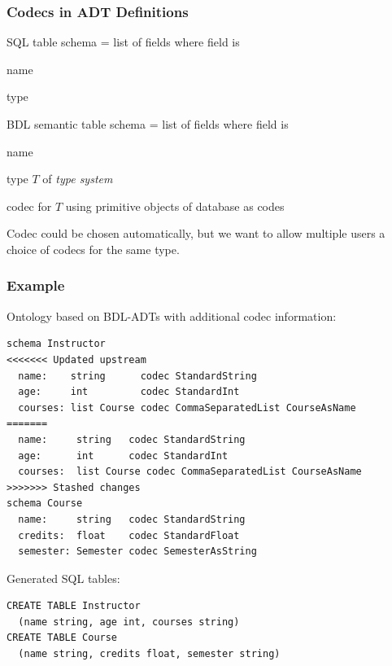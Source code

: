 \begin{frame}\frametitle{Codecs in ADT Definitions}
\begin{blockitems}{SQL table schema = list of fields where field is}
\item name
\item type 
\end{blockitems}

\begin{blockitems}{BDL semantic table schema = list of fields where field is}
\item name
\item type $T$ of \emph{type system} 
\item codec for $T$ using primitive objects of database as codes
\end{blockitems}

Codec could be chosen automatically, but we want to allow multiple users a choice of codecs for the same type.
\end{frame}

\begin{frame}[fragile]\frametitle{Example}
Ontology based on BDL-ADTs with additional codec information:
\begin{lstlisting}[basicstyle=\footnotesize]
schema Instructor
<<<<<<< Updated upstream
  name:    string      codec StandardString
  age:     int         codec StandardInt
  courses: list Course codec CommaSeparatedList CourseAsName
=======
  name:     string   codec StandardString
  age:      int      codec StandardInt
  courses:  list Course codec CommaSeparatedList CourseAsName
>>>>>>> Stashed changes
schema Course
  name:     string   codec StandardString
  credits:  float    codec StandardFloat
  semester: Semester codec SemesterAsString
\end{lstlisting}
\medskip

Generated SQL tables:
\begin{lstlisting}[basicstyle=\footnotesize]
CREATE TABLE Instructor
  (name string, age int, courses string)
CREATE TABLE Course
  (name string, credits float, semester string)
\end{lstlisting}
\end{frame}

